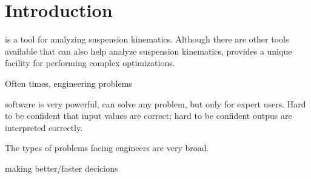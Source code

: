 \chapter{Introduction} \label{ch:introduction}


\vvase{} is a tool for analyzing suspension kinematics.  Although there are other tools available that can also help analyze suspension kinematics, \vvase{} provides a unique facility for performing complex optimizations.

Often times, engineering problems 

software is very powerful, can solve any problem, but only for expert users.  Hard to be confident that input values are correct; hard to be confident outpus are interpreted correctly.

The types of problems facing engineers are very broad.

making better/faster decicions


